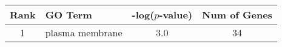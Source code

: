 \centering \begin{tabular}{c|p{4in}|c|c}
Rank	&GO Term	&-log($p$-value)	&Num of Genes\\\hline
1	&plasma membrane	&3.0	&34\\
\end{tabular}
